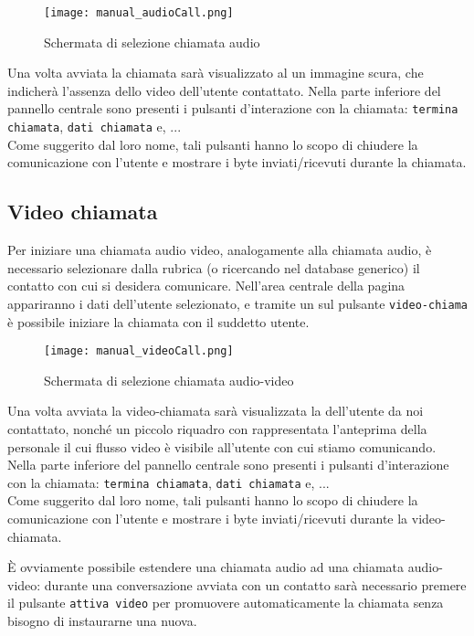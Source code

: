 \begin{figure}[H]
  \texttt{[image: manual\_audioCall.png]}
\caption{Schermata di selezione chiamata audio}\label{fig:audioCall}
\end{figure}

Una volta avviata la chiamata sarà visualizzato al un immagine scura, che indicherà l'assenza dello  video dell'utente contattato. 
Nella parte inferiore del pannello centrale sono presenti i pulsanti d'interazione con la chiamata: \texttt{termina chiamata}, \texttt{dati chiamata} e, ...\\
Come suggerito dal loro nome, tali pulsanti hanno lo scopo di chiudere la comunicazione con l'utente e mostrare i byte inviati/ricevuti durante la chiamata.


\subsection{Video chiamata}
Per iniziare una chiamata audio video, analogamente alla chiamata audio, è necessario selezionare dalla rubrica (o ricercando nel database generico) il contatto con cui si desidera comunicare. Nell'area centrale della pagina appariranno i dati dell'utente selezionato, e tramite un  sul pulsante 
\texttt{video-chiama} è possibile iniziare la chiamata con il suddetto utente.

\begin{figure}[H]
  \texttt{[image: manual\_videoCall.png]}
\caption{Schermata di selezione chiamata audio-video}\label{fig:videoCall}
\end{figure}

Una volta avviata la video-chiamata sarà visualizzata la  dell'utente da noi contattato, nonché un piccolo riquadro con rappresentata l'anteprima della  personale il cui flusso video è visibile all'utente con cui stiamo comunicando. 
Nella parte inferiore del pannello centrale sono presenti i pulsanti d'interazione con la chiamata: \texttt{termina chiamata}, \texttt{dati chiamata} e, ...\\
Come suggerito dal loro nome, tali pulsanti hanno lo scopo di chiudere la comunicazione con l'utente e mostrare i byte inviati/ricevuti durante la video-chiamata.

È ovviamente possibile estendere una chiamata audio ad una chiamata audio-video: durante una conversazione avviata con un contatto sarà necessario premere il pulsante \texttt{attiva video} per promuovere automaticamente la chiamata senza bisogno di instaurarne una nuova.


